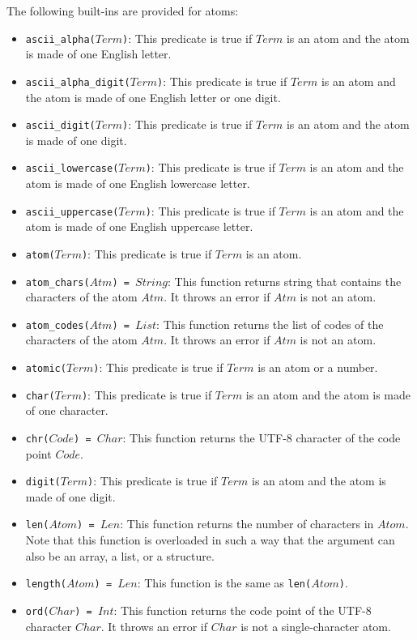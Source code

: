 The following built-ins are provided for atoms:
\begin{itemize}
\item \texttt{ascii\_alpha($Term$)}: This predicate is true if $Term$ is an atom and the atom is made of one English letter.
\item \texttt{ascii\_alpha\_digit($Term$)}: This predicate is true if $Term$ is an atom and the atom is made of one English letter or one digit.
\item \texttt{ascii\_digit($Term$)}: This predicate is true if $Term$ is an atom and the atom is made of one digit.
\item \texttt{ascii\_lowercase($Term$)}: This predicate is true if $Term$ is an atom and the atom is made of one English lowercase letter.
\item \texttt{ascii\_uppercase($Term$)}: This predicate is true if $Term$ is an atom and the atom is made of one English uppercase letter.
\item \texttt{atom($Term$)}: This predicate is true if $Term$ is an atom.
\item \texttt{atom\_chars($Atm$) = $String$}: This function returns string that contains the characters of the atom $Atm$. It throws an error if $Atm$ is not an atom.
\item \texttt{atom\_codes($Atm$) = $List$}: This function returns the list of codes of the characters of the atom $Atm$. It throws an error if $Atm$ is not an atom. 
\item \texttt{atomic($Term$)}: This predicate is true if $Term$ is an atom or a number.
\item \texttt{char($Term$)}: This predicate is true if $Term$ is an atom and the atom is made of one character.
\item \texttt{chr($Code$) = $Char$}: This function returns the UTF-8 character of the code point $Code$.  
\item \texttt{digit($Term$)}: This predicate is true if $Term$ is an atom and the atom is made of one digit.
\item \texttt{len($Atom$) = $Len$}: This function returns the number of characters in $Atom$. Note that this function is overloaded in such a way that the argument can also be an array, a list, or a structure.
\item \texttt{length($Atom$) = $Len$}: This function is the same as \texttt{len($Atom$)}.
\item \texttt{ord($Char$) = $Int$}: This function returns the code point of the UTF-8 character $Char$.  It throws an error if $Char$ is not a single-character atom.
\end{itemize}

